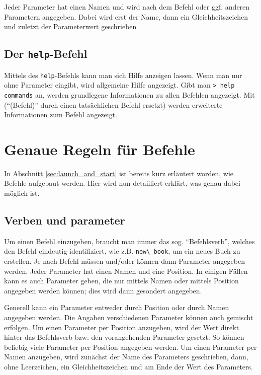 Jeder Parameter hat einen Namen und wird nach dem Befehl oder ggf. anderen Parametern angegeben. Dabei wird erst der Name, dann ein Gleichheitszeichen und zuletzt der Parameterwert geschrieben


\subsection{Der \texttt{help}-Befehl}
\label{subsec:launch_and_start:help}

Mittels des \texttt{help}-Befehls kann man sich Hilfe anzeigen lassen. Wenn man nur  ohne Parameter eingibt, wird allgemeine Hilfe angezeigt. Gibt man \mbox{\texttt{> help commands}} an, werden grundlegene Informationen zu allen Befehlen angezeigt. Mit  (``(Befehl)'' durch einen tatsächlichen Befehl ersetzt) werden erweiterte Informationen zum Befehl angezeigt.

\section{Genaue Regeln für Befehle}
\label{sec:command_syntax_complete}

In Abschnitt \ref{sec:launch_and_start} ist bereits kurz erläutert worden, wie Befehle aufgebaut werden. Hier wird nun detailliert erklärt, was genau dabei möglich ist.

\subsection{Verben und parameter}
\label{subsec:command_syntax_complete:verbs_and_params}

Um einen Befehl einzugeben, braucht man immer das sog. ``Befehlsverb'', welches den Befehl eindeutig identifiziert, wie z.B. \verb+new\_book+, um ein neues Buch zu erstellen.
Je nach Befehl müssen und/oder können dann Parameter angegeben werden. Jeder Parameter hat einen Namen und eine Position. In einigen Fällen kann es auch Parameter geben, die nur mittels Namen oder mittels Position angegeben werden können; dies wird dann gesondert angegeben.

Generell kann ein Parameter entweder durch Position oder durch Namen angegeben werden. Die Angaben verschiedenen Parameter können auch gemischt erfolgen. Um einen Parameter per Position anzugeben, wird der Wert direkt hinter das Befehlsverb bzw. den vorangehenden Parameter gesetzt. So können beliebig viele Parameter per Position angegeben werden. Um einen Parameter per Namen anzugeben, wird zunächst der Name des Parameters geschrieben, dann, ohne Leerzeichen, ein Gleichheitszeichen und am Ende der Wert des Parameters.

